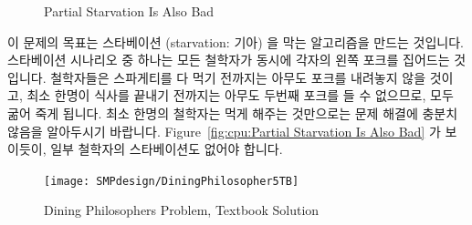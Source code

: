 \begin{figure}[tb]
\centering
{}
\caption{Partial Starvation Is Also Bad}
\end{figure}

이 문제의 목표는 스타베이션 (starvation: 기아) 을 막는 알고리즘을 만드는
것입니다.
스타베이션 시나리오 중 하나는 모든 철학자가 동시에 각자의 왼쪽 포크를 집어드는
것입니다.
철학자들은 스파게티를 다 먹기 전까지는 아무도 포크를 내려놓지 않을 것이고, 최소
한명이 식사를 끝내기 전까지는 아무도 두번째 포크를 들 수 없으므로, 모두 굶어
죽게 됩니다.
최소 한명의 철학자는 먹게 해주는 것만으로는 문제 해결에 충분치 않음을
알아두시기 바랍니다.
Figure~\ref{fig:cpu:Partial Starvation Is Also Bad} 가 보이듯이, 일부 철학자의
스타베이션도 없어야 합니다.

\begin{figure}[tb]
\centering
\texttt{[image: SMPdesign/DiningPhilosopher5TB]}
\caption{Dining Philosophers Problem, Textbook Solution}
\end{figure}

